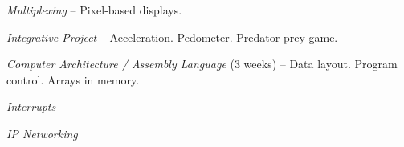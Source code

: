 \emph{Multiplexing} -- Pixel-based displays.

\emph{Integrative Project} -- Acceleration. Pedometer. Predator-prey game.

\emph{Computer Architecture / Assembly Language} (3 weeks) -- Data layout.
Program control. Arrays in memory.


\emph{Interrupts}

\emph{IP Networking}
